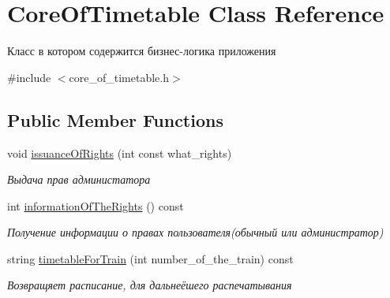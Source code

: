 \hypertarget{class_core_of_timetable}{}\section{Core\+Of\+Timetable Class Reference}
\label{class_core_of_timetable}


Класс в котором содержится бизнес-\/логика приложения  




{\ttfamily \#include $<$core\+\_\+of\+\_\+timetable.\+h$>$}

\subsection*{Public Member Functions}
\begin{DoxyCompactItemize}
\item 
void \hyperlink{class_core_of_timetable_a43c809d0be060e1179db9d81e6b21a9c}{issuance\+Of\+Rights} (int const what\+\_\+rights)\hypertarget{class_core_of_timetable_a43c809d0be060e1179db9d81e6b21a9c}{}\label{class_core_of_timetable_a43c809d0be060e1179db9d81e6b21a9c}

\begin{DoxyCompactList}\small\item\em Выдача прав администатора \end{DoxyCompactList}\item 
int \hyperlink{class_core_of_timetable_a52036eb03efc6236767b5662b5db299f}{information\+Of\+The\+Rights} () const \hypertarget{class_core_of_timetable_a52036eb03efc6236767b5662b5db299f}{}\label{class_core_of_timetable_a52036eb03efc6236767b5662b5db299f}

\begin{DoxyCompactList}\small\item\em Получение информации о правах пользователя(обычный или администратор) \end{DoxyCompactList}\item 
string \hyperlink{class_core_of_timetable_a741fb0013b50013a90c824f3527c1555}{timetable\+For\+Train} (int number\+\_\+of\+\_\+the\+\_\+train) const \hypertarget{class_core_of_timetable_a741fb0013b50013a90c824f3527c1555}{}\label{class_core_of_timetable_a741fb0013b50013a90c824f3527c1555}

\begin{DoxyCompactList}\small\item\em Возвращяет расписание, для дальнеёшего распечатывания \end{DoxyCompactList}\end{DoxyCompactItemize}


